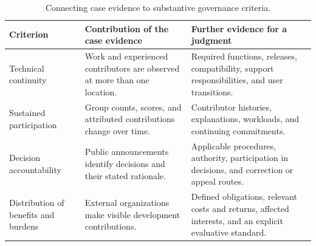 \begin{table}[tbp]
\caption{Connecting case evidence to substantive governance criteria.}
\label{tab:ch9-judgments}
\centering\small\renewcommand{\arraystretch}{1.14}
\begin{tabularx}{\linewidth}{@{}>{\raggedright\arraybackslash}p{24mm}>{\raggedright\arraybackslash}X>{\raggedright\arraybackslash}X@{}}\toprule
Criterion & Contribution of the case evidence & Further evidence for a judgment \\\midrule
Technical continuity & Work and experienced contributors are observed at more than one location. & Required functions, releases, compatibility, support responsibilities, and user transitions.\\
Sustained participation & Group counts, scores, and attributed contributions change over time. & Contributor histories, explanations, workloads, and continuing commitments.\\
Decision accountability & Public announcements identify decisions and their stated rationale. & Applicable procedures, authority, participation in decisions, and correction or appeal routes.\\
Distribution of benefits and burdens & External organizations make visible development contributions. & Defined obligations, relevant costs and returns, affected interests, and an explicit evaluative standard.\\\bottomrule
\end{tabularx}
\end{table}
